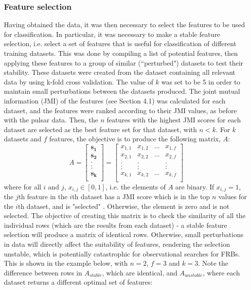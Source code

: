 \documentclass[12pt]{article}
\renewcommand{\vec}[1]{\mathbf{#1}}
\begin{document}
\subsubsection{Feature selection}
Having obtained the data, it was then necessary to select the features to be used for classification. In particular, it was necessary to make a stable feature selection, i.e. select a set of features that is useful for classification of different training datasets. This was done by compiling a list of potential features, then applying these features to a group of similar (``perturbed") datasets to test their stability. These datasets were created from the dataset containing all relevant data by using k-fold cross validation. The value of $k$ was set to be 5 in order to maintain small perturbations between the datasets produced. The joint mutual information (JMI) of the features (see Section 4.1) was calculated for each dataset, and the features were ranked according to their JMI values, as before with the pulsar data. Then, the $n$ features with the highest JMI scores for each dataset are selected as the best feature set for that dataset, with $n < k$. For $k$ datasets and $f$ features, the objective is to produce the following matrix, $A$:
\[
A =
  \begin{bmatrix}
    \vec{s_{1}} \\
    \vec{s_{2}} \\
    .	\\
    :	\\
    \vec{s_{k}} \\
  \end{bmatrix}
  =
  \begin{bmatrix}
    x_{1,1} & x_{1,2} & ... & x_{1,f} \\
    x_{2,1} & x_{2,2} & ... & x_{2,f} \\
    .	    & .       & 	& .       \\
    :		& :		  &		& :	      \\
    x_{k,1} & x_{k,2} & ... & x_{k,f} \\
  \end{bmatrix}
\]
where for all $i$ and $j$, $x_{i,j} \in [0,1]$, i.e. the elements of $A$ are binary. If $x_{i,j} = 1$, the $j$th feature in the $i$th dataset has a JMI score which is in the top $n$ values for the $i$th dataset, and is "selected" \cite{nogueira2016measuring}. Otherwise, the element is zero and is not selected. The objective of creating this matrix is to check the similarity of all the individual rows (which are the results from each dataset) - a stable feature selection will produce a matrix of identical rows. Otherwise, small perturbations in data will directly affect the suitability of features, rendering the selection unstable, which is potentially catastrophic for observational searches for FRBs. This is shown in the example below, with $n = 2$, $f = 3$ and $k = 3$. Note the difference between rows in $A_{stable}$, which are identical, and $A_{unstable}$, where each dataset returns a different optimal set of features:
\end{document}
